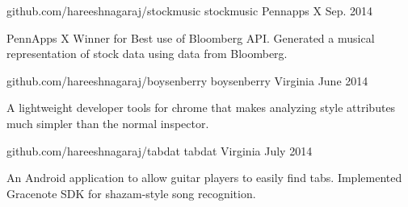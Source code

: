 

\begin{cventries}

  \cventry
    {github.com/hareeshnagaraj/stockmusic} %
    {stockmusic} %
    {Pennapps X} %
    {Sep. 2014} %
    {
      \begin{cvitems} %
        \item {PennApps X Winner for Best use of Bloomberg API. Generated a musical representation of stock data using data from Bloomberg.}
      \end{cvitems}
    }
    
\cventry
  {github.com/hareeshnagaraj/boysenberry} %
  {boysenberry} %
  {Virginia} %
  {June 2014} %
  {
    \begin{cvitems} %
      \item {A lightweight developer tools for chrome that makes analyzing style attributes much simpler than the normal inspector.}
    \end{cvitems}
  }

  \cventry
    {github.com/hareeshnagaraj/tabdat} %
    {tabdat} %
    {Virginia} %
    {July 2014} %
    {
      \begin{cvitems} %
        \item {An Android application to allow guitar players to easily find tabs. Implemented Gracenote SDK for shazam-style song recognition.}
      \end{cvitems}
    }
\end{cventries}
